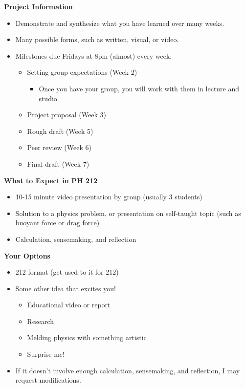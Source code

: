 \documentclass[]{article}
\begin{document}
\begin{PresentSpace}
	\textbf{Project Information}
	\begin{itemize}
		\item Demonstrate and synthesize what you have learned over many weeks.
		\item Many possible forms, such as written, visual, or video.
		\item Milestones due Fridays at 8pm (almost) every week:
		\begin{itemize}
			\item Setting group expectations (Week 2)
			\begin{itemize}
				\item Once you have your group, you will work with them in lecture and studio.
			\end{itemize}
			\item Project proposal (Week 3)
			\item Rough draft (Week 5)
			\item Peer review (Week 6)
			\item Final draft (Week 7)
		\end{itemize}
	\end{itemize}
	\textbf{What to Expect in PH 212}
	\begin{itemize}
		\item 10-15 minute video presentation by group (usually 3 students)
		\item Solution to a physics problem, or presentation on self-taught topic (such as buoyant force or drag force)
		\item Calculation, sensemaking, and reflection
	\end{itemize}
	\textbf{Your Options}
	\begin{itemize}
		\item 212 format (get used to it for 212)
		\item Some other idea that excites you!
		\begin{itemize}
			\item Educational video or report
			\item Research
			\item Melding physics with something artistic
			\item Surprise me!
		\end{itemize}
		\item If it doesn't involve enough calculation, sensemaking, and reflection, I may request modifications.
	\end{itemize}
\end{PresentSpace}
\end{document}
